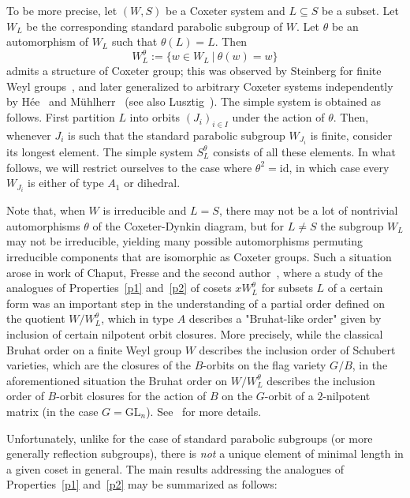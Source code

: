 To be more precise, let $(W,S)$ be a Coxeter system and $L\subseteq S$ be a subset. Let $W_L$ be the corresponding standard parabolic subgroup of $W$. Let $\theta$ be an automorphism of $W_L$ such that $\theta(L)=L$. Then $$W_L^\theta:=\{w\in W_L \ \vert \ \theta(w)=w\}$$ admits a structure of Coxeter group; this was observed by Steinberg for finite Weyl groups~\cite[Section 11]{Steinberg}, and later generalized to arbitrary Coxeter systems independently by Hée~\cite{Hee_1} and Mühlherr~\cite{muhlh} (see also Lusztig~\cite[Appendix]{Lus_book}). The simple system is obtained as follows. First partition $L$ into orbits $(J_i)_{i\in I}$ under the action of $\theta$. Then, whenever $J_i$ is such that the standard parabolic subgroup $W_{J_i}$ is finite, consider its longest element. The simple system $S_L^\theta$ consists of all these elements. In what follows, we will restrict ourselves to the case where $\theta^2=\mathrm{id}$, in which case every $W_{J_i}$ is either of type $A_1$ or dihedral.  

Note that, when $W$ is irreducible and $L=S$, there may not be a lot of nontrivial automorphisms $\theta$ of the Coxeter-Dynkin diagram, but for $L\neq S$ the subgroup $W_L$ may not be irreducible, yielding many possible automorphisms permuting irreducible components that are isomorphic as Coxeter groups. Such a situation arose in work of Chaput, Fresse and the second author~\cite[Section 3]{CFG}, where a study of the analogues of Properties~\ref{p1} and~\ref{p2} of cosets $x W_L^\theta$ for subsets $L$ of a certain form was an important step in the understanding of a partial order defined on the quotient $W/W_L^\theta$, which in type $A$ describes a "Bruhat-like order" given by inclusion of certain nilpotent orbit closures. More precisely, while the classical Bruhat order on a finite Weyl group $W$ describes the inclusion order of Schubert varieties, which are the closures of the $B$-orbits on the flag variety $G/B$, in the aforementioned situation the Bruhat order on $W/W_L^\theta$ describes the inclusion order of $B$-orbit closures for the action of $B$ on the $G$-orbit of a $2$-nilpotent matrix (in the case $G=\mathrm{GL}_n$). See~\cite[Theorem 9.1]{CFG} for more details.   

Unfortunately, unlike for the case of standard parabolic subgroups (or more generally reflection subgroups), there is \textit{not} a unique element of minimal length in a given coset in general. The main results addressing the analogues of Properties~\ref{p1} and~\ref{p2} may be summarized as follows: 

